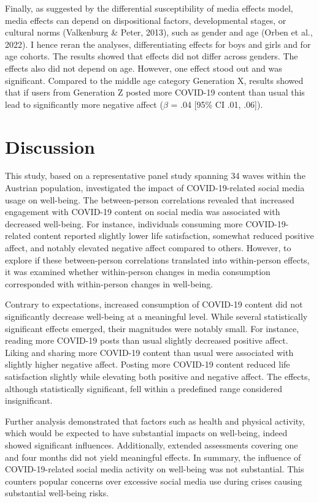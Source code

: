 \documentclass[
  man,mask,floatsintext]{apa7}
\begin{document}
Finally, as suggested by the differential susceptibility of media effects model, media effects can depend on dispositional factors, developmental stages, or cultural norms (Valkenburg \& Peter, 2013), such as gender and age (Orben et al., 2022).
I hence reran the analyses, differentiating effects for boys and girls and for age cohorts.
The results showed that effects did not differ across genders.
The effects also did not depend on age.
However, one effect stood out and was significant.
Compared to the middle age category Generation X, results showed that if users from Generation Z posted more COVID-19 content than usual this lead to significantly more negative affect (\(\beta\) = .04 {[}95\% CI .01, .06{]}).

\hypertarget{discussion}{%
\section{Discussion}\label{discussion}}

This study, based on a representative panel study spanning 34 waves within the Austrian population, investigated the impact of COVID-19-related social media usage on well-being. The between-person correlations revealed that increased engagement with COVID-19 content on social media was associated with decreased well-being. For instance, individuals consuming more COVID-19-related content reported slightly lower life satisfaction, somewhat reduced positive affect, and notably elevated negative affect compared to others. However, to explore if these between-person correlations translated into within-person effects, it was examined whether within-person changes in media consumption corresponded with within-person changes in well-being.

Contrary to expectations, increased consumption of COVID-19 content did not significantly decrease well-being at a meaningful level. While several statistically significant effects emerged, their magnitudes were notably small. For instance, reading more COVID-19 posts than usual slightly decreased positive affect. Liking and sharing more COVID-19 content than usual were associated with slightly higher negative affect. Posting more COVID-19 content reduced life satisfaction slightly while elevating both positive and negative affect. The effects, although statistically significant, fell within a predefined range considered insignificant.

Further analysis demonstrated that factors such as health and physical activity, which would be expected to have substantial impacts on well-being, indeed showed significant influences. Additionally, extended assessments covering one and four months did not yield meaningful effects. In summary, the influence of COVID-19-related social media activity on well-being was not substantial. This counters popular concerns over excessive social media use during crises causing substantial well-being risks.
\end{document}
